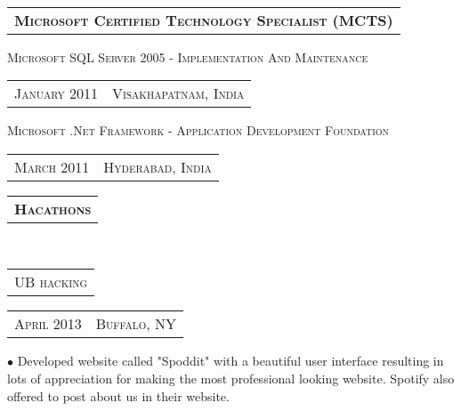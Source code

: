 \documentclass[10pt,a4paper,oneside]{article}
\begin{document}
    \vspace{4pt}\\
    \begin{tabular}{l}
        \textbf{\normalsize M\textsc{icrosoft} C\textsc{ertified} T\textsc{echnology} \textbf{S\textsc{pecialist} (MCTS)}}
    \end{tabular}
    \vspace{2pt}
    \begin{adjustwidth}{7pt}{0pt}
        {\small M\textsc{icrosoft} SQL S\textsc{erver} 2005 - I\textsc{mplementation} A\textsc{nd} M\textsc{aintenance}}
        \hspace{1.64in}
        \textcolor{light-gray}{
        \begin{tabular}{c|c}
            {\small J\textsc{anuary 2011}}
            &{\small V\textsc{isakhapatnam}, I\textsc{ndia}}
        \end{tabular}
    }
    \end{adjustwidth}
    \vspace{-12pt}
    \begin{adjustwidth}{7pt}{0pt}
        {\small M\textsc{icrosoft} .N\textsc{et} F\textsc{ramework} - A\textsc{pplication} D\textsc{evelopment} F\textsc{oundation}}
        \hspace{1.72in}
    \textcolor{light-gray}{
        \begin{tabular}{c|c}
            {\small M\textsc{arch 2011}}
            &{\small H\textsc{yderabad}, I\textsc{ndia}}
        \end{tabular}
    }
    \vspace{-10pt}
    \end{adjustwidth}
    \begin{tabular}{c}
        \textbf{\normalsize H\textsc{acathons}}
    \end{tabular}\\
    \begin{tabular}{c}
        {\small UB\textsc{ hacking}}
    \end{tabular}
    \hspace{5.35in}
    \textcolor{light-gray}{
        \begin{tabular}{c|c}
            {\small A\textsc{pril 2013}}
            &{\small B\textsc{uffalo}, NY}
        \end{tabular}
    }
    \vspace{-12pt}
    \begin{adjustwidth}{7pt}{0pt}
        {\footnotesize  $\bullet$ Developed website called "Spoddit" with a beautiful user interface resulting in lots of appreciation for making the most professional looking website. Spotify also  offered to post about us in their website.}\\
    \end{adjustwidth}
\end{document}
